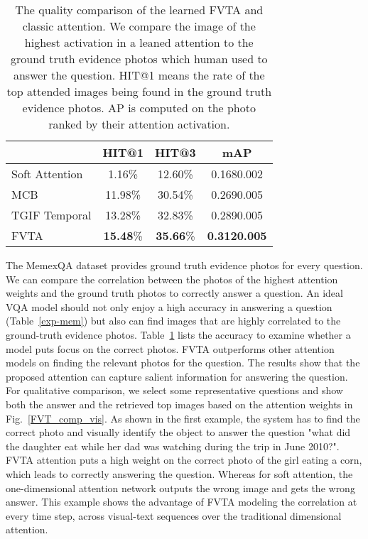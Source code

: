 \begin{table}[ht]
\centering
\begin{tabular}{l||c|c|c}
\hline
               & HIT@1 & HIT@3 & mAP \\ \hline \hline
Soft Attention    & 1.16\%         & 12.60\% & 0.1680.002                      \\
MCB    & 11.98\%         & 30.54\% & 0.2690.005                      \\
TGIF Temporal    & 13.28\%         & 32.83\% & 0.2890.005                      \\
FVTA & \textbf{15.48}\%          & \textbf{35.66}\%    & \textbf{0.3120.005}                  \\
\hline
\end{tabular}
\vspace{1mm}
\caption{The quality comparison of the learned FVTA and classic attention. We compare the image of the highest activation in a leaned attention to the ground truth evidence photos which human used to answer the question. HIT@1 means the rate of the top attended images being found in the ground truth evidence photos. AP is computed on the photo ranked by their attention activation.}
\label{att-acc}
\vspace{-3mm}
\end{table}



The MemexQA dataset provides ground truth evidence photos for every question. We can compare the correlation between the photos of the highest attention weights and the ground truth photos to correctly answer a question. An ideal VQA model should not only enjoy a high accuracy in answering a question (Table~\ref{exp-mem}) but also can find images that are highly correlated to the ground-truth evidence photos. Table~\ref{att-acc} lists the accuracy to examine whether a model puts focus on the correct photos. FVTA outperforms other attention models on finding the relevant photos for the question. The results show that the proposed attention can capture salient information for answering the question. For qualitative comparison, we select some representative questions and show both the answer and the retrieved top images based on the attention weights in Fig.~\ref{FVT_comp_vis}. 
As shown in the first example, the system has to find the correct photo and visually identify the object to answer the question "what did the daughter eat while her dad was watching during the trip in June 2010?". FVTA attention puts a high weight on the correct photo of the girl eating a corn, which leads to correctly answering the question. Whereas for soft attention, the one-dimensional attention network outputs the wrong image and gets the wrong answer.
This example shows the advantage of FVTA modeling the correlation at every time step, across visual-text sequences over the traditional dimensional attention. 

